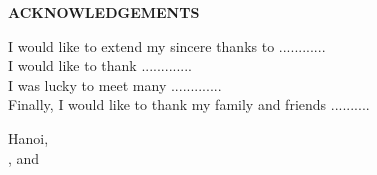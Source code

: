 \thispagestyle{plain}

\begin{center}
 \Large {\bf \uppercase{Acknowledgements}}
\end{center}

\vspace{2\baselineskip}

\noindent
I would like to extend my sincere thanks to ............\\


\noindent 
I would like to thank .............\\

\noindent I was lucky to meet many .............\\

\noindent Finally, I would like to thank my family and friends ..........



\vspace{1cm}
\begin{flushright}
Hanoi, \reportSubmissionDate\\
\textit{\firstAuthor}, \textit{\secondAuthor} and \textit{\thirdAuthor}
\end{flushright} 